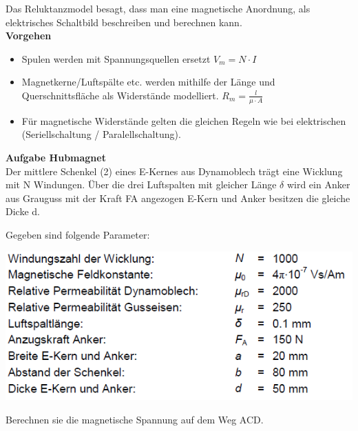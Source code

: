 \beginip
Das Reluktanzmodel besagt, dass man eine magnetische Anordnung, als elektrisches Schaltbild beschreiben und berechnen kann. \\
\textbf{Vorgehen} \\
\begin{itemize}
	\item Spulen werden mit Spannungsquellen ersetzt $V_m = N\cdot I$
	\item Magnetkerne/Luftspälte etc. werden mithilfe der Länge und Querschnittsfläche als Widerstände modelliert. $R_m =  \frac{l}{\mu \cdot A}$
	\item Für magnetische Widerstände gelten die gleichen Regeln wie bei elektrischen (Seriellschaltung / Paralellschaltung).
\end{itemize}

\iend
\newpage
{}
\beginbsp
\textbf{Aufgabe Hubmagnet} \\
Der mittlere Schenkel (2) eines E-Kernes aus Dynamoblech trägt eine Wicklung mit N Windungen. Über
die drei Luftspalten mit gleicher Länge $\delta$ wird ein Anker aus Grauguss mit der Kraft FA angezogen
E-Kern und Anker besitzen die gleiche Dicke d. \\
\begin{center}
\end{center}
Gegeben sind folgende Parameter: \\

\begin{center}
	\includegraphics[scale=0.6]{img/ex5-3.png}
\end{center}
Berechnen sie die magnetische Spannung auf dem Weg ACD.
\iend

